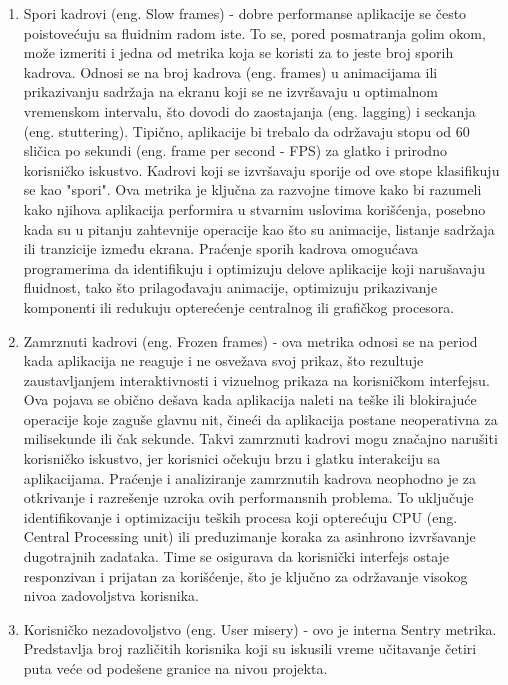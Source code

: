 \documentclass[12pt,oneside]{memoir}
\begin{document}
\begin{enumerate}
    \item Spori kadrovi (eng. Slow frames) - dobre performanse aplikacije se često poistovećuju sa fluidnim radom iste. To se, pored posmatranja golim okom, može izmeriti i jedna od metrika koja se koristi za to jeste broj sporih kadrova. Odnosi se na broj kadrova (eng. frames) u animacijama ili prikazivanju sadržaja na ekranu koji se ne izvršavaju u optimalnom vremenskom intervalu, što dovodi do zaostajanja (eng. lagging) i seckanja (eng. stuttering). Tipično, aplikacije bi trebalo da održavaju stopu od 60 sličica po sekundi (eng. frame per second - FPS) za glatko i prirodno korisničko iskustvo. Kadrovi koji se izvršavaju sporije od ove stope klasifikuju se kao "spori". Ova metrika je ključna za razvojne timove kako bi razumeli kako njihova aplikacija performira u stvarnim uslovima korišćenja, posebno kada su u pitanju zahtevnije operacije kao što su animacije, listanje sadržaja ili tranzicije između ekrana. Praćenje sporih kadrova omogućava programerima da identifikuju i optimizuju delove aplikacije koji narušavaju fluidnost, tako što prilagođavaju animacije, optimizuju prikazivanje komponenti ili redukuju opterećenje centralnog ili grafičkog procesora.
    \item Zamrznuti kadrovi (eng. Frozen frames) - ova metrika odnosi se na period kada aplikacija ne reaguje i ne osvežava svoj prikaz, što rezultuje zaustavljanjem interaktivnosti i vizuelnog prikaza na korisničkom interfejsu. Ova pojava se obično dešava kada aplikacija naleti na teške ili blokirajuće operacije koje zaguše glavnu nit, čineći da aplikacija postane neoperativna za milisekunde ili čak sekunde. Takvi zamrznuti kadrovi mogu značajno narušiti korisničko iskustvo, jer korisnici očekuju brzu i glatku interakciju sa aplikacijama. Praćenje i analiziranje zamrznutih kadrova neophodno je za otkrivanje i razrešenje uzroka ovih performansnih problema. To uključuje identifikovanje i optimizaciju teških procesa koji opterećuju CPU (eng. Central Processing unit) ili preduzimanje koraka za asinhrono izvršavanje dugotrajnih zadataka. Time se osigurava da korisnički interfejs ostaje responzivan i prijatan za korišćenje, što je ključno za održavanje visokog nivoa zadovoljstva korisnika.
    \item Korisničko nezadovoljstvo (eng. User misery) - ovo je interna Sentry metrika. Predstavlja broj različitih korisnika koji su iskusili vreme učitavanje četiri puta veće od podešene granice na nivou projekta. 
\end{enumerate}
\end{document}
